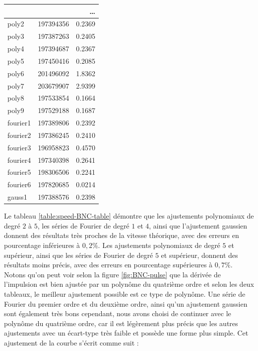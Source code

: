 \begin{onehalfspace}
\begin{longtable}{p{2.0cm} p{4.0cm} p{2.0cm} }
        \midrule
        \multicolumn{3}{r}{{\dots}} \\
        \midrule
        \endfoot
        
        \bottomrule
        \endlastfoot
        
        poly2     & 197394356     & 0.2369 \\
        poly3     & 197387263     & 0.2405 \\
        poly4     & 197394687     & 0.2367 \\
        poly5     & 197450416     & 0.2085 \\
        poly6     & 201496092     & 1.8362 \\
        poly7     & 203679907     & 2.9399 \\
        poly8     & 197533854     & 0.1664 \\
        poly9     & 197529188     & 0.1687 \\
        fourier1  & 197389806     & 0.2392 \\
        fourier2  & 197386245     & 0.2410 \\
        fourier3  & 196958823     & 0.4570 \\
        fourier4  & 197340398     & 0.2641 \\
        fourier5  & 198306506     & 0.2241 \\
        fourier6  & 197820685     & 0.0214 \\
        gauss1    & 197388576     & 0.2398

    \end{longtable}
    
    \noindent Le tableau \ref{table:speed-BNC-table} démontre 
    que les ajustements
    polynomiaux de degré $2$ à $5$, les séries de Fourier de degré 
    $1$ et $4$, ainsi que l'ajustement gaussien donnent des résultats
    très proches de la vitesse théorique, avec des erreurs en 
    pourcentage inférieures à $0,2\%$. Les ajustements polynomiaux de 
    degré $5$ et supérieur, ainsi que les séries de Fourier de degré 
    $5$ et supérieur, donnent des résultats moins précis, avec des
    erreurs en pourcentage supérieures à $0,7\%$. Notons qu'on peut 
    voir selon 
    la figure \ref{fig:BNC-pulse} que la dérivée de l'impulsion 
    est bien ajustée par
    un polynôme du quatrième ordre et selon les deux tableaux, le 
    meilleur ajustement possible est ce type de polynôme. Une série de 
    Fourier du premier ordre et du deuxième ordre, ainsi qu’un
    ajustement gaussien sont également très bons cependant,
    nous avons choisi de
    continuer avec le polynôme du quatrième ordre, car il est
    légèrement plus précis que les autres ajustements avec un écart-type
    très faible et possède
    une forme plus simple. Cet ajustement de
    la courbe s'écrit comme suit :


\end{onehalfspace}
